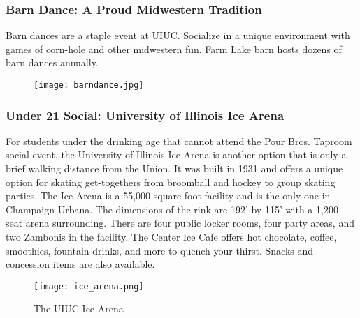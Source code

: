 \subsubsection{Barn Dance: A Proud Midwestern Tradition}
Barn dances are a staple event at UIUC. Socialize in a unique environment with games of corn-hole and other midwestern fun. Farm Lake barn hosts dozens of barn dances annually. 
\vspace{0.5cm}\newline
\begin{figure}[H]
	\centering
	\texttt{[image: barndance.jpg]}
\end{figure}

\subsubsection{Under 21 Social: University of Illinois Ice Arena}
For students under the drinking age that cannot attend the Pour Bros. Taproom social event, the University of Illinois Ice Arena is another option that is only a brief walking distance from the Union. It was built in 1931 and offers a unique option for skating get-togethers from broomball and hockey to group skating parties. The Ice Arena is a 55,000 square foot facility and is the only one in Champaign-Urbana. The dimensions of the rink are 192' by 115' with a 1,200 seat arena surrounding. There are four public locker rooms, four party areas, and two Zambonis in the facility. The Center Ice Cafe offers hot chocolate, coffee, smoothies, fountain drinks, and more to quench your thirst.  Snacks and concession items are also available.
\vspace{0.5cm}\newline
\begin{figure}[H]
	\centering
	\texttt{[image: ice\_arena.png]}
	\caption{The UIUC Ice Arena}
\end{figure}

